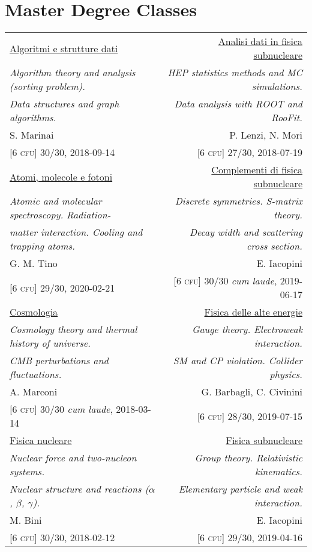 \section*{Master Degree Classes}
\begin{tabular*}{\textwidth}{l @{\extracolsep{\fill}} r}
  {\ul {Algoritmi e strutture dati}} & {\ul {Analisi dati in fisica subnucleare}}\\
  {\small \emph {Algorithm theory and analysis (sorting problem).}} & {\small \emph {HEP statistics methods and MC simulations.}}\\
  {\small \emph {Data structures and graph algorithms.}} & {\small \emph {Data analysis with ROOT and RooFit.}}\\
  {\small S. Marinai} & {\small P. Lenzi, N. Mori}\\
  {\small [6 \textsc{cfu}] 30/30, 2018-09-14} & {\small [6 \textsc{cfu}] 27/30, 2018-07-19}\\ [3mm]

  {\ul {Atomi, molecole e fotoni}} & {\ul {Complementi di fisica subnucleare}}\\
  {\small \emph {Atomic and molecular spectroscopy. Radiation-}} & {\small \emph {Discrete symmetries. S-matrix theory.}}\\
  {\small \emph {matter interaction. Cooling and trapping atoms.}} & {\small \emph {Decay width and scattering cross section.}}\\
  {\small G. M. Tino} & {\small E. Iacopini}\\
  {\small [6 \textsc{cfu}] 29/30, 2020-02-21} & {\small [6 \textsc{cfu}] 30/30 \textit{cum laude}, 2019-06-17}\\ [3mm]

  {\ul {Cosmologia}} & {\ul {Fisica delle alte energie}}\\
  {\small \emph {Cosmology theory and thermal history of universe.}} & {\small \emph {Gauge theory. Electroweak interaction.}}\\
  {\small \emph {CMB perturbations and fluctuations.}} & {\small \emph {SM and CP violation. Collider physics.}}\\
  {\small A. Marconi} & {\small G. Barbagli, C. Civinini}\\
  {\small [6 \textsc{cfu}] 30/30 \textit{cum laude}, 2018-03-14} & {\small [6 \textsc{cfu}] 28/30, 2019-07-15}\\ [3mm]

  {\ul {Fisica nucleare}} & {\ul {Fisica subnucleare}}\\
  {\small \emph {Nuclear force and two-nucleon systems.}} & {\small \emph {Group theory. Relativistic kinematics.}}\\
  {\small \emph {Nuclear structure and reactions ($\alpha$, $\beta$, $\gamma$).}} & {\small \emph {Elementary particle and weak interaction.}}\\
  {\small M. Bini} & {\small E. Iacopini}\\
  {\small [6 \textsc{cfu}] 30/30, 2018-02-12} & {\small [6 \textsc{cfu}] 29/30, 2019-04-16}\\ [3mm]


\end{tabular*}
